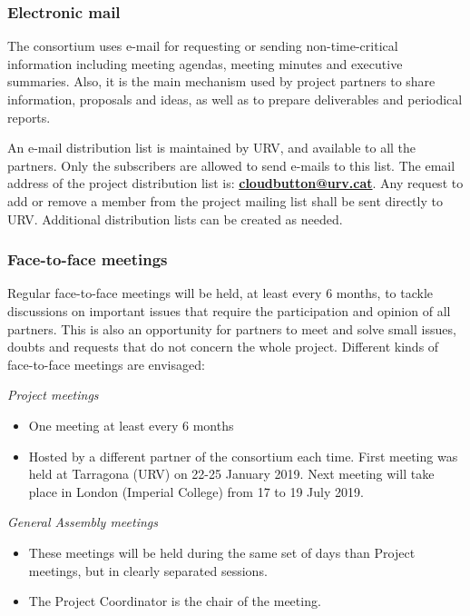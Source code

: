 \documentclass[a4paper,11pt]{article}
\begin{document}
\subsubsection{Electronic mail}

The consortium uses e-mail for requesting or sending non-time-critical information including meeting agendas, meeting minutes and executive summaries. Also, it is the main mechanism used by project partners to share information, proposals and ideas, as well as to prepare deliverables and periodical reports.

An e-mail distribution list is maintained by URV, and available to all the partners. Only the subscribers are allowed to send e-mails to this list. The email address of the project distribution list is: \href{mailto:cloudbutton@urv.cat}{\textbf{cloudbutton@urv.cat}}. Any request to add or remove a member from the project mailing list shall be sent directly to URV. Additional distribution lists can be created as needed.

\subsubsection{Face-to-face meetings}
\label{sec:f2f_meetings}

Regular face-to-face meetings will be held, at least every 6 months, to tackle discussions on important issues that require the participation and opinion of all partners.
This is also an opportunity for partners to meet and solve small issues, doubts and requests that do not concern the whole project. Different kinds of face-to-face meetings are envisaged:

\vspace{0.4cm}

\emph{Project meetings}

\begin{itemize}
\item One meeting at least every 6 months
\item Hosted by a different partner of the consortium each time. First meeting was held at Tarragona (URV) on 22-25 January 2019. Next meeting will take place in London (Imperial College) from 17 to 19 July 2019.
\end{itemize}

\emph{General Assembly meetings}

\begin{itemize}
\item These meetings will be held during the same set of days than Project meetings, but in clearly separated sessions.
\item The Project Coordinator is the chair of the meeting.
\end{itemize}
\end{document}

